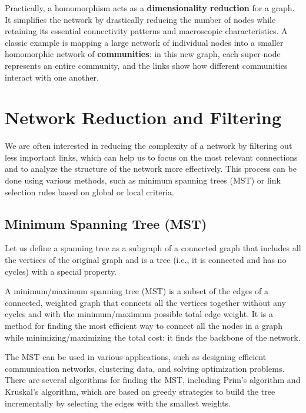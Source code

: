 Practically, a homomorphism acts as a \textbf{dimensionality reduction} for a graph. It simplifies the network by drastically reducing the number of nodes while retaining its essential connectivity patterns and macroscopic characteristics. A classic example is mapping a large network of individual nodes into a smaller homomorphic network of \textbf{communities}: in this new graph, each super-node represents an entire community, and the links show how different communities interact with one another.

\section{Network Reduction and Filtering}

We are often interested in reducing the complexity of a network by filtering out less important links, which can help us to focus on the most relevant connections and to analyze the structure of the network more effectively. This process can be done using various methods, such as minimum spanning trees (MST) or link selection rules based on global or local criteria.

\subsection{Minimum Spanning Tree (MST)}

Let us define a spanning tree as a subgraph of a connected graph that includes all the vertices of the original graph and is a tree (i.e., it is connected and has no cycles) with a special property.

\begin{definition}
    A minimum/maximum spanning tree (MST) is a subset of the edges of a connected, weighted graph that connects all the vertices together without any cycles and with the minimum/maximum possible total edge weight. It is a method for finding the most efficient way to connect all the nodes in a graph while minimizing/maximizing the total cost: it finds the backbone of the network.
\end{definition}

The MST can be used in various applications, such as designing efficient communication networks, clustering data, and solving optimization problems. There are several algorithms for finding the MST, including Prim's algorithm and Kruskal's algorithm, which are based on greedy strategies to build the tree incrementally by selecting the edges with the smallest weights.

